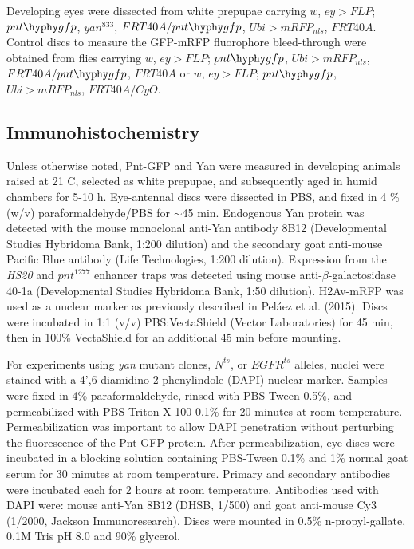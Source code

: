 Developing eyes were dissected from white prepupae carrying $w$, $ey>FLP$; $pnt\hyphy gfp$, $yan^{833}$, $FRT40A/pnt\hyphy gfp$, $Ubi>mRFP_{nls}$, $FRT40A$. Control discs to measure the GFP-mRFP fluorophore bleed-through were obtained from flies carrying $w$, $ey>FLP$; $pnt\hyphy gfp$, $Ubi>mRFP_{nls}$, $FRT40A/pnt\hyphy gfp$, $FRT40A$ or $w$, $ey>FLP$; $pnt\hyphy gfp$, $Ubi>mRFP_{nls}$, $FRT40A/CyO$.

\subsection{Immunohistochemistry}
\label{appendix:methods:ratio:immunohistochemistry}

Unless otherwise noted, Pnt-GFP and Yan were measured in developing animals raised at 21 \textdegree{} C, selected as white prepupae, and subsequently aged in humid chambers for 5-10 h. Eye-antennal discs were dissected in PBS, and fixed in 4 \% (w/v) paraformaldehyde/PBS for $\sim$45 min. Endogenous Yan protein was detected with the mouse monoclonal anti-Yan antibody 8B12 (Developmental Studies Hybridoma Bank, 1:200 dilution) and the secondary goat anti-mouse Pacific Blue antibody (Life Technologies, 1:200 dilution). Expression from the \textit{HS20} and $pnt^{1277}$ enhancer traps was detected using mouse anti-$\beta$-galactosidase 40-1a (Developmental Studies Hybridoma Bank, 1:50 dilution). H2Av-mRFP was used as a nuclear marker as previously described in Pel\'{a}ez et al. (2015). Discs were incubated in 1:1 (v/v) PBS:VectaShield (Vector Laboratories) for 45 min, then in 100\% VectaShield for an additional 45 min before mounting.

For experiments using \textit{yan} mutant clones, $N^{ts}$, or $EGFR^{ts}$ alleles, nuclei were stained with a 4',6-diamidino-2-phenylindole (DAPI) nuclear marker. Samples were fixed in 4\% paraformaldehyde, rinsed with PBS-Tween 0.5\%, and permeabilized with PBS-Triton X-100 0.1\% for 20 minutes at room temperature. Permeabilization was important to allow DAPI penetration without perturbing the fluorescence of the Pnt-GFP protein. After permeabilization, eye discs were incubated in a blocking solution containing PBS-Tween 0.1\% and 1\% normal goat serum for 30 minutes at room temperature. Primary and secondary antibodies were incubated each for 2 hours at room temperature. Antibodies used with DAPI were: mouse anti-Yan 8B12 (DHSB, 1/500) and goat anti-mouse Cy3 (1/2000, Jackson Immunoresearch). Discs were mounted in 0.5\% n-propyl-gallate, 0.1M Tris pH 8.0 and 90\% glycerol.

